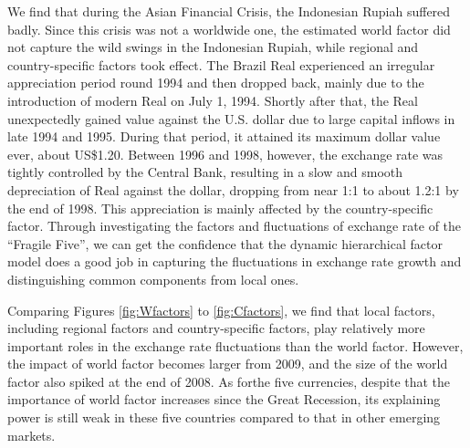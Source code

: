 \documentclass[12pt]{article}
\numberwithin{equation}{section}
\begin{document}
We find that during the Asian Financial Crisis, the Indonesian Rupiah suffered badly. Since this crisis was not a worldwide one, the estimated world factor did not capture the wild swings in the Indonesian Rupiah, while regional and country-specific factors took effect. The Brazil Real experienced an irregular appreciation period round 1994 and then dropped back, mainly due to the introduction of modern Real on July 1, 1994. Shortly after that, the Real unexpectedly gained value against the U.S. dollar due to large capital inflows in late 1994 and 1995. During that period, it attained its maximum dollar value ever, about US\$1.20. Between 1996 and 1998, however, the exchange rate was tightly controlled by the Central Bank, resulting in a slow and smooth depreciation of Real against the dollar, dropping from near 1:1 to about 1.2:1 by the end of 1998. This appreciation is mainly affected by the country-specific factor. Through investigating the factors and fluctuations of exchange rate of the ``Fragile Five'', we can get the confidence that the dynamic hierarchical factor model does a good job in capturing the fluctuations in exchange rate growth and distinguishing common components from local ones.


Comparing Figures \ref{fig:Wfactors} to \ref{fig:Cfactors}, we find that local factors, including regional factors and country-specific factors, play relatively more important roles in the exchange rate fluctuations than the world factor. However, the impact of world factor becomes larger from 2009, and the size of the world factor also spiked at the end of 2008. As forthe five currencies, despite that the importance of world factor increases since the Great Recession, its explaining power is still weak in these five countries compared to that in other emerging markets.
\end{document}
